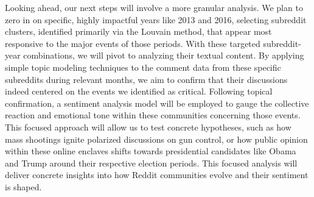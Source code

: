 \documentclass{article}
\begin{document}
Looking ahead, our next steps will involve a more granular analysis. We plan to zero in on specific, highly impactful years like 2013 and 2016, selecting subreddit clusters, identified primarily via the Louvain method, that appear most responsive to the major events of those periods. With these targeted subreddit-year combinations, we will pivot to analyzing their textual content. By applying simple topic modeling techniques to the comment data from these specific subreddits during relevant months, we aim to confirm that their discussions indeed centered on the events we identified as critical. Following topical confirmation, a sentiment analysis model will be employed to gauge the collective reaction and emotional tone within these communities concerning those events. This focused approach will allow us to test concrete hypotheses, such as how mass shootings ignite polarized discussions on gun control, or how public opinion within these online enclaves shifts towards presidential candidates like Obama and Trump around their respective election periods. This focused analysis will deliver concrete insights into how Reddit communities evolve and their sentiment is shaped.






\end{document}
